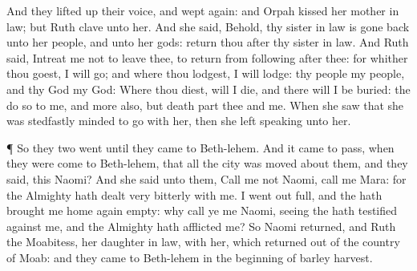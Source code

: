 {And they lifted
up their
voice, and wept
again: and
Orpah
kissed her mother in
law; but
Ruth
clave unto her.
And she
said, Behold, thy sister in
law is gone
back unto her
people, and unto her
gods:
return thou
after thy sister in
law.
And
Ruth
said,
Intreat me not to
leave thee,
{} to
return from following
after thee: for whither thou
goest, I will
go; and where thou
lodgest, I will
lodge: thy
people
{} my
people, and thy
God my
God:
Where thou
diest, will I
die, and there will I be
buried: the
{}
do so to me, and
more also,
{} but
death
part thee and me.
When she
saw that she was stedfastly
minded to
go with her, then she
left
speaking unto her.
\par }{\PP {}¶ So they
two
went until they
came to
Beth-lehem. And it came to pass, when they were
come to
Beth-lehem, that all the
city was
moved about them, and they
said,
{} this
Naomi?
And she
said unto them,
Call me not
Naomi,
call me
Mara: for the
Almighty hath dealt
very
bitterly with me.
I went
out
full, and the
{} hath brought me home
again
empty: why
{}
call ye me
Naomi, seeing the
{} hath
testified against me, and the
Almighty hath
afflicted me?
So
Naomi
returned, and
Ruth the
Moabitess, her daughter in
law, with her, which
returned out of the
country of
Moab: and they
came to
Beth-lehem in the
beginning of
barley
harvest.

}
